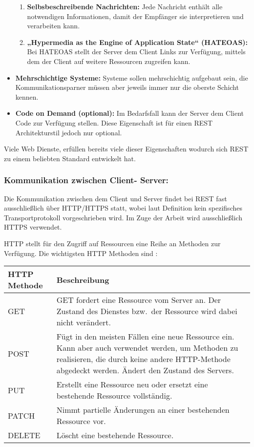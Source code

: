 \begin{itemize}
\begin{enumerate}
		\item \textbf{Selbsbeschreibende Nachrichten:}
		Jede Nachricht enthält alle notwendigen Informationen, damit der Empfänger sie interpretieren und verarbeiten kann.
		
		\item \textbf{„Hypermedia as the Engine of Application State“ (HATEOAS):} 
		Bei HATEOAS stellt der Server dem Client Links zur Verfügung, mittels dem der Client auf weitere Ressourcen zugreifen kann.
	\end{enumerate}
	
	\item \textbf{Mehrschichtige Systeme:}
	Systeme sollen mehrschichtig aufgebaut sein, die Kommunikationsparner müssen aber jeweils immer nur die oberste Schicht kennen.
	
	\item \textbf{Code on Demand (optional):}
	Im Bedarfsfall kann der Server dem Client Code zur Verfügung stellen. Diese Eigenschaft ist für einen REST Architekturstil jedoch nur optional.
\end{itemize} 
\parencite{fielding2000rest}

Viele Web Dienste, erfüllen bereits viele dieser Eigenschaften wodurch sich REST zu einem beliebten Standard entwickelt hat.

\clearpage

\subsubsection*{Kommunikation zwischen Client- Server:}
Die Kommunikation zwischen dem Client und Server findet bei REST fast ausschließlich über HTTP/HTTPS statt, wobei laut Definition kein spezifisches Transportprotokoll vorgeschrieben wird. Im Zuge der Arbeit wird ausschließlich HTTPS verwendet.

HTTP stellt für den Zugriff auf Ressourcen eine Reihe an Methoden zur Verfügung. Die wichtigsten HTTP Methoden sind : \newline

\begin{tabularx}{\textwidth}{|l|X|}
	\hline
	\textbf{HTTP Methode} & \textbf{Beschreibung} \\
	\hline
	GET & GET fordert eine Ressource vom Server an. Der Zustand des Dienstes bzw.\ der Ressource wird dabei nicht verändert. \\
	\hline
	POST & Fügt in den meisten Fällen eine neue Ressource ein. Kann aber auch verwendet werden, um Methoden zu realisieren, die durch keine andere HTTP-Methode abgedeckt werden. Ändert den Zustand des Servers. \\
	\hline
PUT & Erstellt eine Ressource neu oder ersetzt eine bestehende Ressource vollständig. \\
\hline
PATCH & Nimmt partielle Änderungen an einer bestehenden Ressource vor. \\
	\hline
	DELETE & Löscht eine bestehende Ressource. \\
	\hline
\end{tabularx} \newline


